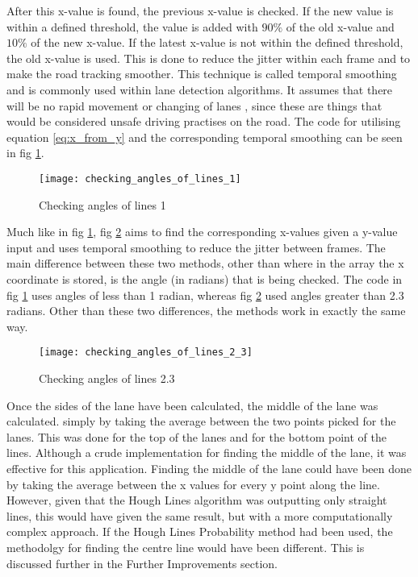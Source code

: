 \documentclass[conference]{IEEEtran}
\begin{document}
After this x-value is found, the previous x-value is checked. If the new value is within a defined threshold, the value is added with $90\%$ of the old x-value and $10\%$ of the new x-value. If the latest x-value is not within the defined threshold, the old x-value is used. This is done to reduce the jitter within each frame and to make the road tracking smoother. This technique is called temporal smoothing \cite{temporal_smoothing} and is commonly used within lane detection algorithms. It assumes that there will be no rapid movement or changing of lanes \cite{deeplane}, since these are things that would be considered unsafe driving practises on the road. The code for utilising equation \ref{eq:x_from_y} and the corresponding temporal smoothing can be seen in fig \ref{fig:checking_angles_of_lines_1}.

\begin{figure}[H]
\centerline{\texttt{[image: checking\_angles\_of\_lines\_1]}}
\caption{Checking angles of lines 1}
\label{fig:checking_angles_of_lines_1}
\end{figure}

Much like in fig \ref{fig:checking_angles_of_lines_1}, fig \ref{fig:checking_angles_of_lines_2.3} aims to find the corresponding x-values given a y-value input and uses temporal smoothing to reduce the jitter between frames. The main difference between these two methods, other than where in the array the x coordinate is stored, is the angle (in radians) that is being checked. The code in fig \ref{fig:checking_angles_of_lines_1} uses angles of less than 1 radian, whereas fig \ref{fig:checking_angles_of_lines_2.3} used angles greater than 2.3 radians. Other than these two differences, the methods work in exactly the same way. 

\begin{figure}[H]
\centerline{\texttt{[image: checking\_angles\_of\_lines\_2\_3]}}
\caption{Checking angles of lines 2.3}
\label{fig:checking_angles_of_lines_2.3}
\end{figure}

Once the sides of the lane have been calculated, the middle of the lane was calculated. simply by taking the average between the two points picked for the lanes. This was done for the top of the lanes and for the bottom point of the lines. Although a crude implementation for finding the middle of the lane, it was effective for this application. Finding the middle of the lane could have been done by taking the average between the x values for every y point along the line. However, given that the Hough Lines algorithm was outputting only straight lines, this would have given the same result, but with a more computationally complex approach. If the Hough Lines Probability method had been used, the methodolgy for finding the centre line would have been different. This is discussed further in the Further Improvements section. 
\end{document}
